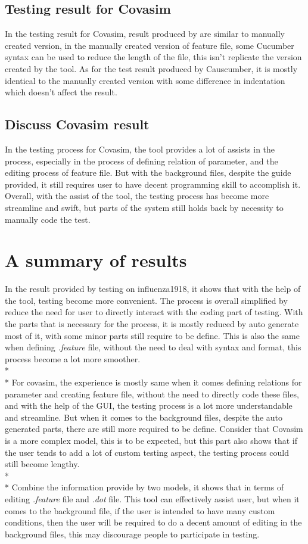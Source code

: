 \subsection{Testing result for Covasim}
In the testing result for Covasim, result produced by are similar to manually created version, in the manually created version of feature file, some Cucumber syntax can be used to reduce the length of the file, this isn’t replicate the version created by the tool. As for the test result produced by Causcumber, it is mostly identical to the manually created version with some difference in indentation which doesn’t affect the result.
\subsection{Discuss Covasim result}
In the testing process for Covasim, the tool provides a lot of assists in the process, especially in the process of defining relation of parameter, and the editing process of feature file. But with the background files, despite the guide provided, it still requires user to have decent programming skill to accomplish it. Overall, with the assist of the tool, the testing process has become more streamline and swift, but parts of the system still holds back by necessity to manually code the test.
\section{A summary of results}
In the result provided by testing on influenza1918, it shows that with the help of the tool, testing become more convenient. The process is overall simplified by reduce the need for user to directly interact with the coding part of testing. With the parts that is necessary for the process, it is mostly reduced by auto generate most of it, with some minor parts still require to be define. This is also the same when defining \textsl{.feature} file, without the need to deal with syntax and format, this process become a lot more smoother. \\*\\*
For covasim, the experience is mostly same when it comes defining relations for parameter and creating feature file, without the need to directly code these files, and with the help of the GUI, the testing process is a lot more understandable and streamline. But when it comes to the background files, despite the auto generated parts, there are still more required to be define. Consider that Covasim is a more complex model, this is to be expected, but this part also shows that if the user tends to add a lot of custom testing aspect, the testing process could still become lengthy.\\*\\*
Combine the information provide by two models, it shows that in terms of editing \textsl{.feature} file and \textsl{.dot} file. This tool can effectively assist user, but when it comes to the background file, if the user is intended to have many custom conditions, then the user will be required to do a decent amount of editing in the background files, this may discourage people to participate in testing.

